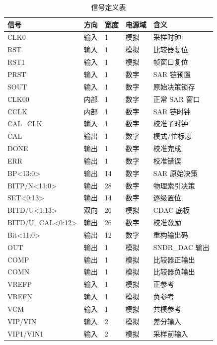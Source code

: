 \documentclass[UTF8,a4paper,11pt]{ctexart}
\begin{document}
\begin{table}[H]
\centering
\caption{信号定义表}
\label{tab:app-signal-defs}
\scriptsize
\begin{tabular}{lllll}
\toprule
信号 & 方向 & 宽度 & 电源域 & 含义 \\
\midrule
CLK0              & 输入 & 1  & 模拟 & 采样时钟 \\
RST               & 输入 & 1  & 模拟 & 比较器复位 \\
RST1              & 输入 & 1  & 模拟 & 帧窗口复位 \\
PRST              & 输入 & 1  & 数字 & SAR 链预置 \\
SOUT              & 输入 & 1  & 数字 & 原始决策锁存 \\
CLK00             & 内部 & 1  & 数字 & 正常 SAR 窗口 \\
CCLK              & 内部 & 1  & 数字 & SAR 链时钟 \\
CAL\_CLK          & 输入 & 1  & 数字 & 校准子时钟 \\
CAL               & 输出 & 1  & 数字 & 模式/忙标志 \\
DONE              & 输出 & 1  & 数字 & 校准完成 \\
ERR               & 输出 & 1  & 数字 & 校准错误 \\
BP<13:0>          & 输出 & 14 & 数字 & SAR 原始决策 \\
BITP/N<13:0>      & 输出 & 28 & 数字 & 物理索引决策 \\
SET<0:13>         & 输出 & 14 & 数字 & 逐级置位 \\
BITD/U<1:13>      & 双向 & 26 & 模拟 & CDAC 底板 \\
BITD/U\_CAL<0:12> & 输出 & 26 & 数字 & 校准激励 \\
Bit<11:0>         & 输出 & 12 & 数字 & 重构输出码 \\
OUT               & 输出 & 1  & 模拟 & SNDR\_DAC 输出 \\
COMP              & 输出 & 1  & 模拟 & 比较器正输出 \\
COMN              & 输出 & 1  & 模拟 & 比较器负输出 \\
VREFP             & 输入 & 1  & 模拟 & 正参考 \\
VREFN             & 输入 & 1  & 模拟 & 负参考 \\
VCM               & 输入 & 1  & 模拟 & 共模参考 \\
VIP/VIN           & 输入 & 2  & 模拟 & 差分输入 \\
VIP1/VIN1         & 输入 & 2  & 模拟 & 采样前输入 \\
\bottomrule
\end{tabular}
\end{table}
\end{document}
